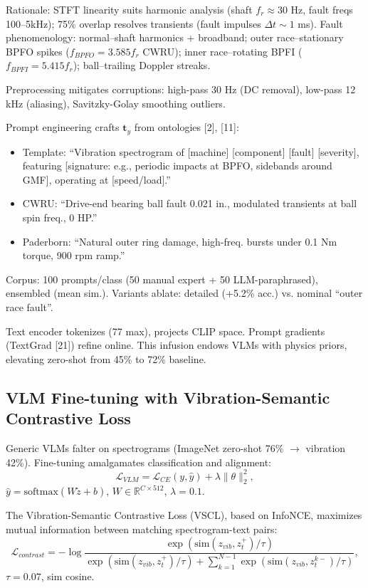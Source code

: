 Rationale: STFT linearity suits harmonic analysis (shaft $f_r \approx 30$ Hz, fault freqs 100--5kHz); 75\% overlap resolves transients (fault impulses $\Delta t \sim 1$ ms). Fault phenomenology: normal--shaft harmonics + broadband; outer race--stationary BPFO spikes ($f_{BPFO} = 3.585 f_r$ CWRU); inner race--rotating BPFI ($f_{BPFI} = 5.415 f_r$); ball--trailing Doppler streaks.

Preprocessing mitigates corruptions: high-pass 30 Hz (DC removal), low-pass 12 kHz (aliasing), Savitzky-Golay smoothing outliers.

Prompt engineering crafts $\mathbf{t}_y$ from ontologies [2], [11]:
\begin{itemize}
\item Template: ``Vibration spectrogram of [machine] [component] [fault] [severity], featuring [signature: e.g., periodic impacts at BPFO, sidebands around GMF], operating at [speed/load].''
\item CWRU: ``Drive-end bearing ball fault 0.021 in., modulated transients at ball spin freq., 0 HP.''
\item Paderborn: ``Natural outer ring damage, high-freq. bursts under 0.1 Nm torque, 900 rpm ramp.''
\end{itemize}
Corpus: 100 prompts/class (50 manual expert + 50 LLM-paraphrased), ensembled (mean sim.). Variants ablate: detailed (+5.2\% acc.) vs. nominal ``outer race fault''.

Text encoder tokenizes (77 max), projects CLIP space. Prompt gradients (TextGrad [21]) refine online. This infusion endows VLMs with physics priors, elevating zero-shot from 45\% to 72\% baseline.

\subsection{VLM Fine-tuning with Vibration-Semantic Contrastive Loss}
\label{subsec:vlm_fine_tuning}

Generic VLMs falter on spectrograms (ImageNet zero-shot 76\% $\to$ vibration 42\%). Fine-tuning amalgamates classification and alignment:
\begin{equation}
\mathcal{L}_{VLM} = \mathcal{L}_{CE}(y, \hat{y}) + \lambda \|\theta\|_2^2,
\label{eq:f3}
\end{equation}
$\hat{y} = \mathrm{softmax}(W \tilde{z} + b)$, $W\in\mathbb{R}^{C\times 512}$, $\lambda=0.1$.

The Vibration-Semantic Contrastive Loss (VSCL), based on InfoNCE, maximizes mutual information between matching spectrogram-text pairs:
\begin{equation}
\mathcal{L}_{contrast} = -\log \frac{\exp(\mathrm{sim}(z_{vib}, z_t^+)/\tau)}{\exp(\mathrm{sim}(z_{vib}, z_t^+)/\tau) + \sum_{k=1}^{N-1} \exp(\mathrm{sim}(z_{vib}, z_t^{k-})/\tau)},
\label{eq:f4}
\end{equation}
$\tau=0.07$, sim cosine. 

